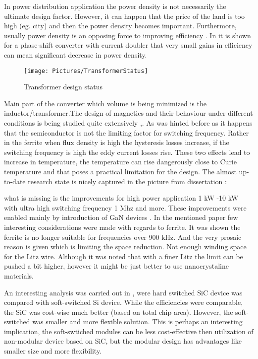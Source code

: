 \documentclass[]{scrartcl}
\begin{document}
In power distribution application the power density is not necessarily the ultimate design factor. However, it can happen that the price of the land is too high (eg. city) and then the power density becomes important. Furthermore, usually power density is an opposing force to improving efficiency \cite{Biela2009}. In \cite{Biela2009} it is shown for a phase-shift converter with current doubler that very small gains in efficiency can mean significant decrease in power density. 

\begin{figure}[h!]
	\centering
	\texttt{[image: Pictures/TransformerStatus]}
	\caption{Transformer design status}
	\label{fig:TransformerStatus}
\end{figure}
Main part of the converter which volume is being minimized is the inductor/transformer.The design of magnetics and their behaviour under different conditions is being studied quite extensively \cite{Su2011},\cite{Mu2014}. As was hinted before as it  happens that the semiconductor is not the limiting factor for switching frequency. Rather in the ferrite when flux density is high the hysteresis losses increase, if the switching frequency is high the eddy current losses rise. These two effects lead to increase in temperature, the temperature can rise dangerously close to Curie temperature and that poses a practical limitation for the design. The almost up-to-date research state is nicely captured in the picture from dissertation \cite{Shen2006} : 



what is missing is the improvements for high power application 1 kW -10 kW with ultra high switching frequency 1 Mhz and more. These improvements were enabled mainly by introduction of GaN devices \cite{Mu2014}. In the mentioned paper \cite{Mu2014} few interesting considerations were made  with regards to ferrite. It was shown the ferrite is no longer suitable for  frequencies over 900 kHz. And the very prosaic reason is given which is limiting the space reduction. Not enough winding space for  the Litz wire. Although it was noted that with a finer Litz the limit can be pushed a bit higher, however it might be just better to use nanocrystaline materials. 


An interesting analysis was carried out in \cite{Waffler2009}, were hard switched SiC device was compared with soft-switched Si device. While the efficiencies were comparable, the SiC was cost-wise much better (based on total chip area). However, the soft-switched was smaller and more flexible solution. This is perhaps an interesting implication, the soft-swtiched modules can be less cost-effective then utilization of non-modular device based on SiC, but the modular design has advantages like smaller size and more flexibility.
\end{document}

